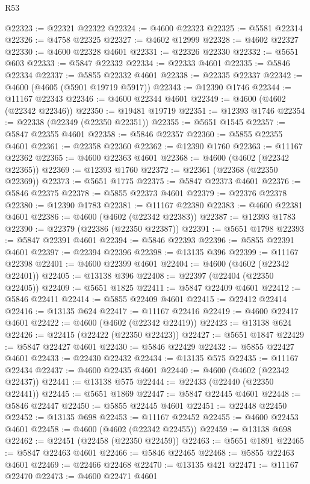 \begin{lexlean}{R53}
\begin{coremodule}
@22323 := @22321 @22322
@22324 := @4600 @22323
@22325 := @5581 @22314
@22326 := @4758 @22325
@22327 := @4602 @12999
@22328 := @4602 @22327
@22330 := @4600 @22328 @4601
@22331 := @22326 @22330
@22332 := @5651 @603
@22333 := @5847 @22332
@22334 := @22333 @4601
@22335 := @5846 @22334
@22337 := @5855 @22332 @4601
@22338 := @22335 @22337
@22342 := @4600 (@4605 (@5901 @19719 @5917))
@22343 := @12390 @1746
@22344 := @11167 @22343
@22346 := @4600 @22344 @4601
@22349 := @4600 (@4602 (@22342 @22346))
@22350 := @19481 @19719
@22351 := @12393 @1746
@22354 := @22338 (@22349 (@22350 @22351))
@22355 := @5651 @1545
@22357 := @5847 @22355 @4601
@22358 := @5846 @22357
@22360 := @5855 @22355 @4601
@22361 := @22358 @22360
@22362 := @12390 @1760
@22363 := @11167 @22362
@22365 := @4600 @22363 @4601
@22368 := @4600 (@4602 (@22342 @22365))
@22369 := @12393 @1760
@22372 := @22361 (@22368 (@22350 @22369))
@22373 := @5651 @1775
@22375 := @5847 @22373 @4601
@22376 := @5846 @22375
@22378 := @5855 @22373 @4601
@22379 := @22376 @22378
@22380 := @12390 @1783
@22381 := @11167 @22380
@22383 := @4600 @22381 @4601
@22386 := @4600 (@4602 (@22342 @22383))
@22387 := @12393 @1783
@22390 := @22379 (@22386 (@22350 @22387))
@22391 := @5651 @1798
@22393 := @5847 @22391 @4601
@22394 := @5846 @22393
@22396 := @5855 @22391 @4601
@22397 := @22394 @22396
@22398 := @13135 @396
@22399 := @11167 @22398
@22401 := @4600 @22399 @4601
@22404 := @4600 (@4602 (@22342 @22401))
@22405 := @13138 @396
@22408 := @22397 (@22404 (@22350 @22405))
@22409 := @5651 @1825
@22411 := @5847 @22409 @4601
@22412 := @5846 @22411
@22414 := @5855 @22409 @4601
@22415 := @22412 @22414
@22416 := @13135 @624
@22417 := @11167 @22416
@22419 := @4600 @22417 @4601
@22422 := @4600 (@4602 (@22342 @22419))
@22423 := @13138 @624
@22426 := @22415 (@22422 (@22350 @22423))
@22427 := @5651 @1847
@22429 := @5847 @22427 @4601
@22430 := @5846 @22429
@22432 := @5855 @22427 @4601
@22433 := @22430 @22432
@22434 := @13135 @575
@22435 := @11167 @22434
@22437 := @4600 @22435 @4601
@22440 := @4600 (@4602 (@22342 @22437))
@22441 := @13138 @575
@22444 := @22433 (@22440 (@22350 @22441))
@22445 := @5651 @1869
@22447 := @5847 @22445 @4601
@22448 := @5846 @22447
@22450 := @5855 @22445 @4601
@22451 := @22448 @22450
@22452 := @13135 @698
@22453 := @11167 @22452
@22455 := @4600 @22453 @4601
@22458 := @4600 (@4602 (@22342 @22455))
@22459 := @13138 @698
@22462 := @22451 (@22458 (@22350 @22459))
@22463 := @5651 @1891
@22465 := @5847 @22463 @4601
@22466 := @5846 @22465
@22468 := @5855 @22463 @4601
@22469 := @22466 @22468
@22470 := @13135 @421
@22471 := @11167 @22470
@22473 := @4600 @22471 @4601

\end{coremodule}
\end{lexlean}

